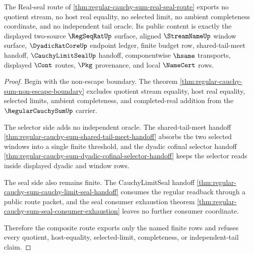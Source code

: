 \begin{theorem}
\label{thm:regular-cauchy-sum-finite-budget-nonescape}
The Real-seal route of \autoref{thm:regular-cauchy-sum-real-seal-route} exports no quotient stream, no host real equality, no selected limit, no ambient completeness coordinate, and no independent tail oracle. Its public content is exactly the displayed two-source $\RegSeqRatUp$ surface, aligned $\StreamNameUp$ window surface, $\DyadicRatCoreUp$ endpoint ledger, finite budget row, shared-tail-meet handoff, $\CauchyLimitSealUp$ handoff, componentwise $\hsame$ transports, displayed $\Cont$ routes, $\Pkg$ provenance, and local $\NameCert$ rows.
\end{theorem}
\begin{proof}
Begin with the non-escape boundary. The theorem \autoref{thm:regular-cauchy-sum-non-escape-boundary} excludes quotient stream equality, host real equality, selected limits, ambient completeness, and completed-real addition from the $\RegularCauchySumUp$ carrier.

The selector side adds no independent oracle. The shared-tail-meet handoff \autoref{thm:regular-cauchy-sum-shared-tail-meet-handoff} absorbs the two selected windows into a single finite threshold, and the dyadic cofinal selector handoff \autoref{thm:regular-cauchy-sum-dyadic-cofinal-selector-handoff} keeps the selector reads inside displayed dyadic and window rows.

The seal side also remains finite. The CauchyLimitSeal handoff \autoref{thm:regular-cauchy-sum-cauchy-limit-seal-handoff} consumes the regular readback through a public route packet, and the seal consumer exhaustion theorem \autoref{thm:regular-cauchy-sum-seal-consumer-exhaustion} leaves no further consumer coordinate.

Therefore the composite route exports only the named finite rows and refuses every quotient, host-equality, selected-limit, completeness, or independent-tail claim.
\end{proof}


